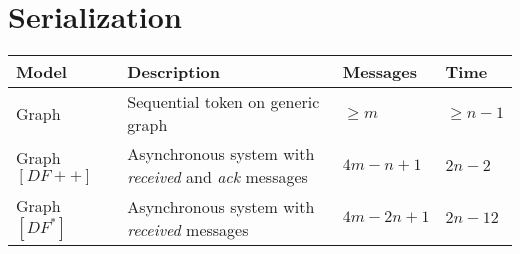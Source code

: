\section{Serialization}
\begin{table}[h]
\begin{tabular}{llll}
			\textbf{Model}		& \textbf{Description}						& \textbf{Messages}						& \textbf{Time} \\
	\hline 	Graph 				& Sequential token on generic graph			& $\geq m$								& $\geq n - 1$ \\
	\hline 	Graph $[DF++]$ 		& Asynchronous system with \emph{received}
	and \emph{ack} messages													& $4m -n + 1$							& $2n - 2$ \\
	\hline 	Graph $[DF^*]$		& Asynchronous system with \emph{received} messages
																			& $4m -2n + 1$								& $2n - 12$ \\
\end{tabular}
\end{table}
